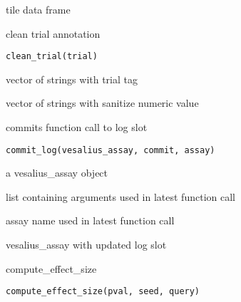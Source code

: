 \documentclass[a4paper]{book}
\begin{document}
%
\begin{Value}
tile data frame
\end{Value}
%
\begin{Description}
clean trial annotation
\end{Description}
%
\begin{Usage}
\begin{verbatim}
clean_trial(trial)
\end{verbatim}
\end{Usage}
%
\begin{Arguments}
\begin{ldescription}
\item[\code{trial}] vector of strings with trial tag
\end{ldescription}
\end{Arguments}
%
\begin{Value}
vector of strings with sanitize numeric value
\end{Value}
%
\begin{Description}
commits function call to log slot
\end{Description}
%
\begin{Usage}
\begin{verbatim}
commit_log(vesalius_assay, commit, assay)
\end{verbatim}
\end{Usage}
%
\begin{Arguments}
\begin{ldescription}
\item[\code{vesalius\_assay}] a vesalius\_assay object

\item[\code{commit}] list containing arguments used in latest function call

\item[\code{assay}] assay name used in latest function call
\end{ldescription}
\end{Arguments}
%
\begin{Value}
vesalius\_assay with updated log slot
\end{Value}
%
\begin{Description}
compute\_effect\_size
\end{Description}
%
\begin{Usage}
\begin{verbatim}
compute_effect_size(pval, seed, query)
\end{verbatim}
\end{Usage}
\end{document}
